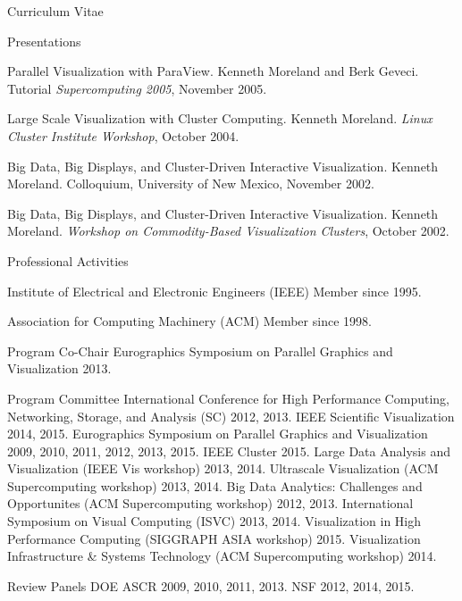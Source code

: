 \documentclass{article}
\begin{document}
\begin{cv}{Curriculum Vitae}
\begin{cvlist}{Presentations}
    \item[Parallel Visualization with ParaView.] Kenneth Moreland and Berk
      Geveci. Tutorial \emph{Supercomputing 2005}, November 2005.
    \item[Large Scale Visualization with Cluster Computing.] Kenneth
      Moreland. \emph{Linux Cluster Institute Workshop}, October 2004.
    \item[Big Data, Big Displays, and Cluster-Driven Interactive
      Visualization.] Kenneth Moreland. Colloquium, University of New
      Mexico, November 2002.
    \item[Big Data, Big Displays, and Cluster-Driven Interactive
      Visualization.] Kenneth Moreland. \emph{Workshop on Commodity-Based
      Visualization Clusters}, October 2002.
    \end{cvlist}

    \begin{cvlist}{Professional Activities}
    \item[Institute of Electrical and Electronic Engineers (IEEE)]
      Member since 1995.
    \item[Association for Computing Machinery (ACM)]  Member since 1998.
    \item[Program Co-Chair] Eurographics Symposium on Parallel Graphics and
      Visualization 2013.
    \item[Program Committee]
      International Conference for High Performance Computing, Networking,
      Storage, and Analysis (SC) 2012, 2013.
      IEEE Scientific Visualization 2014, 2015.
      Eurographics Symposium on Parallel Graphics and Visualization 2009,
      2010, 2011, 2012, 2013, 2015.
      IEEE Cluster 2015.
      Large Data Analysis and Visualization (IEEE Vis workshop) 2013, 2014.
      Ultrascale Visualization (ACM Supercomputing workshop) 2013, 2014.
      Big Data Analytics: Challenges and Opportunites (ACM Supercomputing
      workshop) 2012, 2013.
      International Symposium on Visual Computing (ISVC) 2013, 2014.
      Visualization in High Performance Computing (SIGGRAPH ASIA workshop)
      2015.
      Visualization Infrastructure \& Systems Technology (ACM
      Supercomputing workshop) 2014.
    \item[Review Panels]
      DOE ASCR 2009, 2010, 2011, 2013.
      NSF 2012, 2014, 2015.
    \end{cvlist}

  \end{cv}
\end{document}
